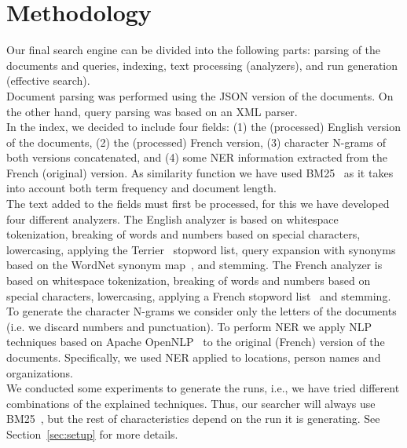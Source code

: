 \section{Methodology}
\label{sec:methodology}

Our final search engine can be divided into the following parts: parsing of the documents and queries, indexing,
text processing (analyzers), and run generation (effective search).\\

Document parsing was performed using the JSON version of the documents.
On the other hand, query parsing was based on an XML parser.\\

In the index, we decided to include four fields: (1) the (processed) English version of the documents, (2) the
(processed) French version, (3) character N-grams of both versions concatenated, and (4) some NER information extracted
from the French (original) version.
As similarity function we have used BM25~\cite{BM25} as it takes into account both term frequency and document length.\\

The text added to the fields must first be processed, for this we have developed four different analyzers.
The English analyzer is based on whitespace tokenization, breaking of words and numbers based on special characters,
lowercasing, applying the Terrier~\cite{OunisEtAl2006} stopword list, query expansion with synonyms based on
the WordNet synonym map~\cite{wordnet}, and stemming.
The French analyzer is based on whitespace tokenization, breaking of words and numbers based on special characters,
lowercasing, applying a French stopword list~\cite{stopword_french} and stemming.
To generate the character N-grams we consider only the letters of the documents (i.e. we discard numbers and
punctuation).
To perform NER we apply NLP techniques based on Apache OpenNLP~\cite{ApacheOpenNLP} to the original (French) version of
the documents.
Specifically, we used NER applied to locations, person names and organizations.\\

We conducted some experiments to generate the runs, i.e., we have tried different combinations of the explained
techniques.
Thus, our searcher will always use BM25~\cite{BM25}, but the rest of characteristics depend on the run it is generating.
See Section~\ref{sec:setup} for more details.